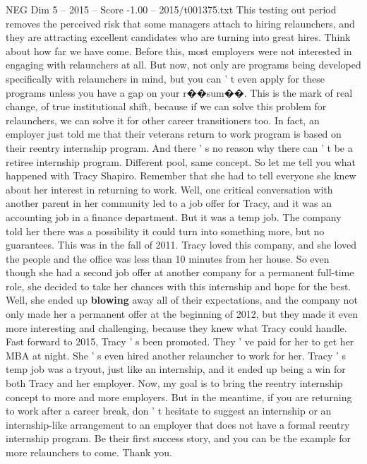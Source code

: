 \begin{textsample}{NEG Dim 5 – 2015 – Score -1.00 – 2015/t001375.txt}
This testing out period removes the perceived risk that some managers attach to hiring relaunchers, and they are attracting excellent candidates who are turning into great hires.
Think about how far we have come.
Before this, most employers were not interested in engaging with relaunchers at all.
But now, not only are programs being developed specifically with relaunchers in mind, but you can ' t even apply for these programs unless you have a gap on your r{\EmojiFont �}{\EmojiFont �}sum{\EmojiFont �}{\EmojiFont �}.
This is the mark of real change, of true institutional shift, because if we can solve this problem for relaunchers, we can solve it for other career transitioners too.
In fact, an employer just told me that their veterans return to work program is based on their reentry internship program.
And there ' s no reason why there can ' t be a retiree internship program.
Different pool, same concept.
So let me tell you what happened with Tracy Shapiro.
Remember that she had to tell everyone she knew about her interest in returning to work.
Well, one critical conversation with another parent in her community led to a job offer for Tracy, and it was an accounting job in a finance department.
But it was a temp job.
The company told her there was a possibility it could turn into something more, but no guarantees.
This was in the fall of 2011.
Tracy loved this company, and she loved the people and the office was less than 10 minutes from her house.
So even though she had a second job offer at another company for a permanent full-time role, she decided to take her chances with this internship and hope for the best.
Well, she ended up \textbf{blowing} away all of their expectations, and the company not only made her a permanent offer at the beginning of 2012, but they made it even more interesting and challenging, because they knew what Tracy could handle.
Fast forward to 2015, Tracy ' s been promoted.
They ' ve paid for her to get her MBA at night.
She ' s even hired another relauncher to work for her.
Tracy ' s temp job was a tryout, just like an internship, and it ended up being a win for both Tracy and her employer.
Now, my goal is to bring the reentry internship concept to more and more employers.
But in the meantime, if you are returning to work after a career break, don ' t hesitate to suggest an internship or an internship-like arrangement to an employer that does not have a formal reentry internship program.
Be their first success story, and you can be the example for more relaunchers to come.
Thank you.

\end{textsample}
